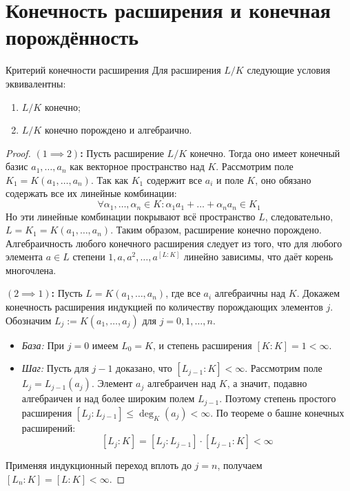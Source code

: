 
\section{Конечность расширения и конечная порождённость}

\begin{Theorem}{Критерий конечности расширения}{}
	Для расширения $L/K$ следующие условия эквивалентны:
	\begin{enumerate}
		\item $L/K$ конечно;
		\item $L/K$ конечно порождено и алгебраично.
	\end{enumerate}
\end{Theorem}

\begin{proof}
	\textbf{$(1 \implies 2)$:} Пусть расширение $L/K$ конечно. Тогда оно имеет конечный базис $a_1, \dots, a_n$ как векторное пространство над $K$. Рассмотрим поле $K_1 = K(a_1, \dots, a_n)$. Так как $K_1$ содержит все $a_i$ и поле $K$, оно обязано содержать все их линейные комбинации:
	\[ \forall \alpha_1, \dots, \alpha_n \in K: \alpha_1 a_1 + \dots + \alpha_n a_n \in K_1 \]
	Но эти линейные комбинации покрывают всё пространство $L$, следовательно, $L = K_1 = K(a_1, \dots, a_n)$. Таким образом, расширение конечно порождено. Алгебраичность любого конечного расширения следует из того, что для любого элемента $a \in L$ степени $1, a, a^2, \dots, a^{[L:K]}$ линейно зависимы, что даёт корень многочлена.

	\textbf{$(2 \implies 1)$:} Пусть $L = K(a_1, \dots, a_n)$, где все $a_i$ алгебраичны над $K$. Докажем конечность расширения индукцией по количеству порождающих элементов $j$. Обозначим $L_j := K(a_1, \dots, a_j)$ для $j = 0, 1, \dots, n$.
	\begin{itemize}
		\item \textit{База:} При $j=0$ имеем $L_0 = K$, и степень расширения $[K:K] = 1 < \infty$.
		\item \textit{Шаг:} Пусть для $j-1$ доказано, что $[L_{j-1}:K] < \infty$. Рассмотрим поле $L_j = L_{j-1}(a_j)$. Элемент $a_j$ алгебраичен над $K$, а значит, подавно алгебраичен и над более широким полем $L_{j-1}$. Поэтому степень простого расширения $[L_j:L_{j-1}] \le \deg_K(a_j) < \infty$. По теореме о башне конечных расширений:
		\[ [L_j:K] = [L_j:L_{j-1}] \cdot [L_{j-1}:K] < \infty \]
	\end{itemize}
	Применяя индукционный переход вплоть до $j=n$, получаем $[L_n:K] = [L:K] < \infty$.
\end{proof}

